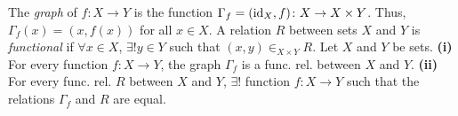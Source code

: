 The \textit{graph} of $f \colon X \to Y$ is the function $\Gamma_f = (\operatorname{id}_X, f) \colon X \to X \times Y$. Thus, $\Gamma_f(x) = (x, f(x))$ for all $x \in X$.
 A relation $R$ between sets $X$ and $Y$ is \textit{functional} if $\forall x \in X$, $\exists! y \in Y$ such that $(x, y) \in_{X \times Y} R$.
 Let $X$ and $Y$ be sets. \textbf{(i)} For every function $f \colon X \to Y$, the graph $\Gamma_f$ is a func. rel. between $X$ and $Y$. \textbf{(ii)} For every func. rel. $R$ between $X$ and $Y$, $\exists!$ function $f \colon X \to Y$ such that the relations $\Gamma_f$ and $R$ are equal.
